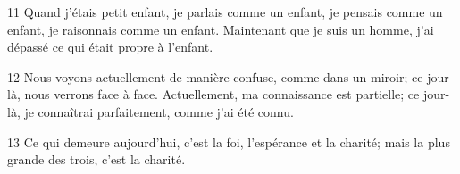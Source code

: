 
11 Quand j’étais petit enfant, je parlais comme un enfant, je pensais comme un enfant, je raisonnais comme un enfant. Maintenant que je suis un homme, j’ai dépassé ce qui était propre à l’enfant.

12 Nous voyons actuellement de manière confuse, comme dans un miroir; ce jour-là, nous verrons face à face. Actuellement, ma connaissance est partielle; ce jour-là, je connaîtrai parfaitement, comme j’ai été connu.

13 Ce qui demeure aujourd’hui, c’est la foi, l’espérance et la charité; mais la plus grande des trois, c’est la charité.